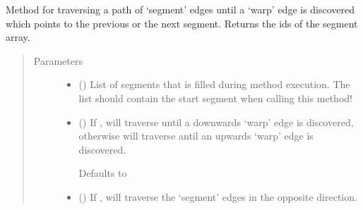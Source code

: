 \documentclass[letterpaper,10pt,english]{sphinxmanual}
\begin{document}
\begin{fulllineitems}
\begin{fulllineitems}
\begin{quote}
\begin{description}
\end{description}\end{quote}

\end{fulllineitems}


\begin{fulllineitems}
\label{\detokenize{cockatoo:cockatoo.KnitMappingNetwork.traverse_segments_until_warp}}
Method for traversing a path of ‘segment’ edges until a ‘warp’
edge is discovered which points to the previous or the next segment.
Returns the ids of the segment array.
\begin{quote}\begin{description}
\item[{Parameters}] \leavevmode\begin{itemize}
\item {} 
 () \textendash{} List of segments that is filled during method execution. The list
should contain the start segment when calling this method!

\item {} 
 (\sphinxstyleliteralemphasis{\sphinxupquote{, }}) \textendash{} 
If , will traverse until a downwards ‘warp’ edge is
discovered, otherwise will traverse antil an upwards ‘warp’ edge
is discovered.

Defaults to 


\item {} 
 (\sphinxstyleliteralemphasis{\sphinxupquote{, }}) \textendash{} 
If , will traverse the ‘segment’ edges in the opposite
direction.


\end{itemize}
\end{description}
\end{quote}
\end{fulllineitems}
\end{fulllineitems}
\end{document}
